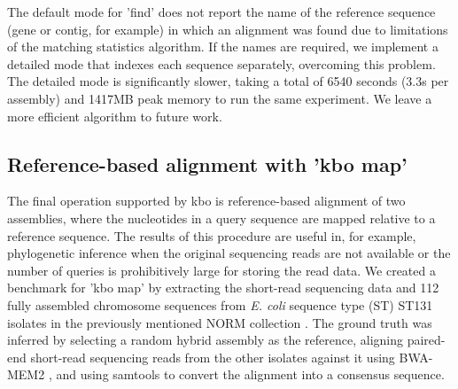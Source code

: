 \documentclass[unnumsec,webpdf,contemporary,large]{oup-authoring-template}%
\theoremstyle{thmstyleone}%
\theoremstyle{thmstyletwo}%
\theoremstyle{thmstylethree}%
\begin{document}
The default mode for 'find' does not report the name of the reference sequence (gene or contig, for example) in which an alignment was found due to limitations of the matching statistics algorithm. If the names are required, we implement a detailed mode that indexes each sequence separately, overcoming this problem. The detailed mode is significantly slower, taking a total of 6540 seconds (3.3s per assembly) and 1417MB peak memory to run the same experiment. We leave a more efficient algorithm to future work.

\subsection{Reference-based alignment with 'kbo map'}

The final operation supported by {\sf kbo} is reference-based alignment of two assemblies, where the nucleotides in a query sequence are mapped relative to a reference sequence. The results of this procedure are useful in, for example, phylogenetic inference when the original sequencing reads are not available or the number of queries is prohibitively large for storing the read data. We created a benchmark for 'kbo map' by extracting the short-read sequencing data and 112 fully assembled chromosome sequences from \textit{E. coli} sequence type (ST) ST131 isolates in the previously mentioned NORM collection \cite{gladstone2021emergence,arredondo2023escherichia}. The ground truth was inferred by selecting a random hybrid assembly as the reference, aligning paired-end short-read sequencing reads from the other isolates against it using BWA-MEM2 \cite{vasimuddin2019efficient}, and using samtools \cite{10.1093/gigascience/giab008} to convert the alignment into a consensus sequence.
\end{document}

